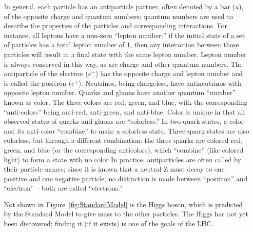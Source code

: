 In general, each particle has an antiparticle partner, 
often denoted by a bar ($\bar{u}$), 
of the opposite charge and quantum numbers; %
quantum numbers are used to describe the properties of the particles 
and corresponding interactions.  
For instance, all leptons have a non-zero ``lepton number;'' 
if the initial state of a set of particles 
has a total lepton number of 1, 
then any interaction between those particles will 
result in a final state with the same lepton number.  
Lepton number is always conserved in this way, 
as are charge and other quantum numbers.  
The antiparticle of the electron ($e^-$) 
has the opposite charge and lepton number 
and is called the positron ($e^+$).  
Neutrinos, being chargeless, 
have antineutrinos with opposite lepton number.  
Quarks and gluons have another quantum ``number'' known as color.   
The three colors are red, green, and blue, with the corresponding 
``anti-colors'' being anti-red, anti-green, and anti-blue.  
Color is unique in that all observed states of quarks and gluons 
are ``colorless.''
In two-quark states, a color and its anti-color ``combine'' to make a colorless state.  
Three-quark states are also colorless, but through a different combination: 
the three quarks are colored red, green, and blue 
(or the corresponding anticolors), which ``combine'' (like colored light) to form 
a state with no color
In practice, antiparticles are often called by their particle names; 
since it is known that a neutral Z must decay to one positive and one negative 
particle, no distinction is made between ``positron'' and ``electron'' -- 
both are called ``electrons.''  

Not shown in Figure~\ref{fig:StandardModel} is the Higgs boson, 
which is predicted by the Standard Model 
to give mass to the other particles.  
The Higgs has not yet been discovered; 
finding it (if it exists) is one of the 
goals of the LHC.  

